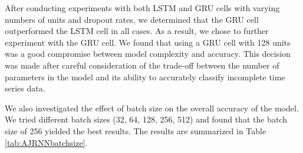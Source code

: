 After conducting experiments with both LSTM and GRU cells with varying numbers of units and dropout rates, we determined that the GRU cell outperformed the LSTM cell in all cases.
As a result, we chose to further experiment with the GRU cell. 
We found that using a GRU cell with 128 units was a good compromise between model complexity and accuracy. 
This decision was made after careful consideration of the trade-off between the number of parameters in the model and its ability to accurately classify incomplete time series data.

We also investigated the effect of batch size on the overall accuracy of the model.
We tried different batch sizes (32, 64, 128, 256, 512) and found that the batch size of 256 yielded the best results.
The results are summarized in Table \ref{tab:AJRNNbatchsize}.

